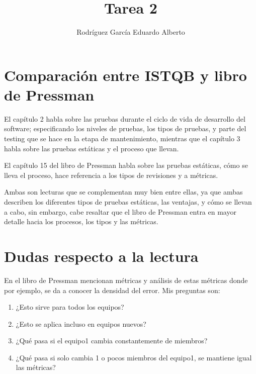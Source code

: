 \documentclass[stu, 12pt, letterpaper, donotrepeattitle, floatsintext, natbib]{apa7}
\title{\Large Tarea 2}
\author{Rodríguez García Eduardo Alberto} %
\begin{document}
    \maketitle


    \renewcommand\contentsname{\largeÍndice}
    \tableofcontents
    \setcounter{tocdepth}{2}
    \clearpage
    \renewcommand{\listfigurename}{\largeÍndice de fíguras}
    \listoffigures
    \clearpage
    \renewcommand{\listtablename}{\largeÍndice de tablas}
    \listoftables
    \clearpage


    \section{\large Comparación entre ISTQB y libro de Pressman}

    El capítulo 2 habla sobre las pruebas durante el ciclo de vida de desarrollo del software; especificando los niveles de pruebas, los tipos de pruebas, y parte del testing que se hace en la etapa de mantenimiento, mientras que el capítulo 3 habla sobre las pruebas estáticas y el proceso que llevan.

    El capítulo 15 del libro de Pressman habla sobre las pruebas estáticas, cómo se lleva el proceso, hace referencia a los tipos de revisiones y a métricas.

    Ambas son lecturas que se complementan muy bien entre ellas, ya que ambas describen los diferentes tipos de pruebas estáticas, las ventajas, y cómo se llevan a cabo, sin embargo, cabe resaltar que el libro de Pressman entra en mayor detalle hacia los procesos, los tipos y las métricas.

    \section{Dudas respecto a la lectura}

    En el libro de Pressman mencionan métricas y análisis de estas métricas donde por ejemplo, se da a conocer la densidad del error. Mis preguntas son: 
    \begin{enumerate}
        \item ¿Esto sirve para todos los equipos?
        \item ¿Esto se aplica incluso en equipos nuevos?
        \item ¿Qué pasa si el equipo1 cambia constantemente de miembros?
        \item ¿Qué pasa si solo cambia 1 o pocos miembros del equipo1, se mantiene igual las métricas?
    \end{enumerate}
    
\end{document}
